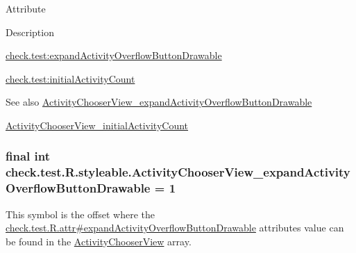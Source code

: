 Attribute

Description 

{\ttfamily \hyperlink{classcheck_1_1test_1_1_r_1_1styleable_a174d1b81e0921eb75bc24ddc8ac899f3}{check.\+test\+:expand\+Activity\+Overflow\+Button\+Drawable}}

{\ttfamily \hyperlink{classcheck_1_1test_1_1_r_1_1styleable_a121ad1bfa72c91eb832d3f651be3caf8}{check.\+test\+:initial\+Activity\+Count}}

\begin{DoxySeeAlso}{See also}
\hyperlink{classcheck_1_1test_1_1_r_1_1styleable_a174d1b81e0921eb75bc24ddc8ac899f3}{Activity\+Chooser\+View\+\_\+expand\+Activity\+Overflow\+Button\+Drawable} 

\hyperlink{classcheck_1_1test_1_1_r_1_1styleable_a121ad1bfa72c91eb832d3f651be3caf8}{Activity\+Chooser\+View\+\_\+initial\+Activity\+Count} 
\end{DoxySeeAlso}
\hypertarget{classcheck_1_1test_1_1_r_1_1styleable_a174d1b81e0921eb75bc24ddc8ac899f3}{}
\subsubsection[{Activity\+Chooser\+View\+\_\+expand\+Activity\+Overflow\+Button\+Drawable}]{\setlength{\rightskip}{0pt plus 5cm}final int check.\+test.\+R.\+styleable.\+Activity\+Chooser\+View\+\_\+expand\+Activity\+Overflow\+Button\+Drawable = 1\hspace{0.3cm}{\ttfamily [static]}}\label{classcheck_1_1test_1_1_r_1_1styleable_a174d1b81e0921eb75bc24ddc8ac899f3}
This symbol is the offset where the \hyperlink{classcheck_1_1test_1_1_r_1_1attr_a4e579a55463671fe043ac88526bf948b}{check.\+test.\+R.\+attr\#expand\+Activity\+Overflow\+Button\+Drawable} attribute\textquotesingle{}s value can be found in the \hyperlink{classcheck_1_1test_1_1_r_1_1styleable_af1c3794ed9efe3a08ba4e2366f7961d3}{Activity\+Chooser\+View} array.

